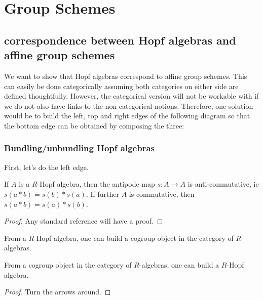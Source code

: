 \section{Group Schemes}


\subsection{correspondence between Hopf algebras and affine group schemes}


We want to show that Hopf algebras correspond to affine group schemes.
This can easily be done categorically assuming both categories on either side are defined thoughtfully.
However, the categorical version will not be workable with if we do not also have links to the non-categorical notions.
Therefore, one solution would be to build the left, top and right edges of the following
diagram so that the bottom edge can be obtained by composing the three:


\subsubsection{Bundling/unbundling Hopf algebras}


First, let's do the left edge.


\begin{proposition}
  \label{0-hopf-antipode-antihom}
  \uses{}
  \leanok

  If $A$ is a $R$-Hopf algebra, then the antipode map $s : A \to A$ is anti-commutative, ie $s(a * b) = s(b) * s(a)$. If further $A$ is commutative, then $s(a * b) = s(a) * s(b)$.
\end{proposition}
\begin{proof}
  \uses{}

  Any standard reference will have a proof.
\end{proof}


\begin{proposition}
  \label{0-hopf-cogrp-alg}
  \uses{}
  \leanok

  From a $R$-Hopf algebra, one can build a cogroup object in the category of $R$-algebras.

  From a cogroup object in the category of $R$-algebras, one can build a $R$-Hopf algebra.
\end{proposition}
\begin{proof}
  \leanok

  Turn the arrows around.
\end{proof}


